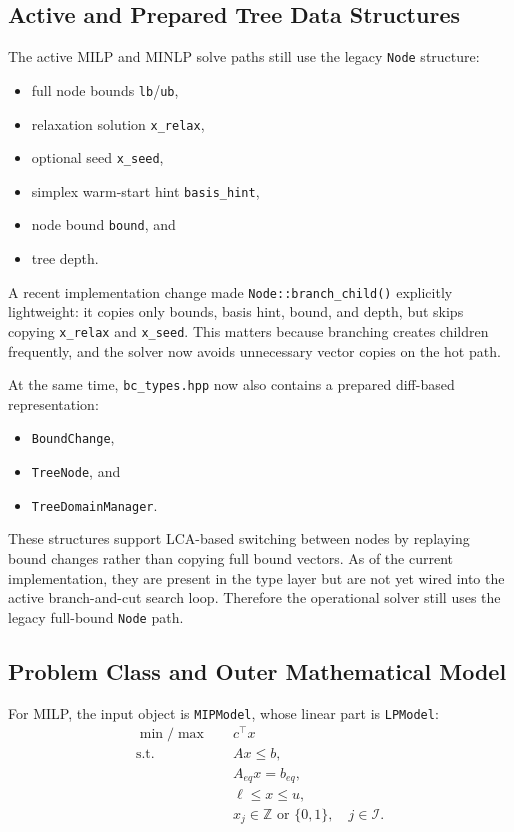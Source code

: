 \subsection{Active and Prepared Tree Data Structures}

The active MILP and MINLP solve paths still use the legacy \texttt{Node} structure:
\begin{itemize}
  \item full node bounds \texttt{lb}/\texttt{ub},
  \item relaxation solution \texttt{x\_relax},
  \item optional seed \texttt{x\_seed},
  \item simplex warm-start hint \texttt{basis\_hint},
  \item node bound \texttt{bound}, and
  \item tree depth.
\end{itemize}

A recent implementation change made \texttt{Node::branch\_child()} explicitly lightweight: it copies only bounds, basis hint, bound, and depth, but skips copying \texttt{x\_relax} and \texttt{x\_seed}. This matters because branching creates children frequently, and the solver now avoids unnecessary vector copies on the hot path.

At the same time, \texttt{bc\_types.hpp} now also contains a prepared diff-based representation:
\begin{itemize}
  \item \texttt{BoundChange},
  \item \texttt{TreeNode}, and
  \item \texttt{TreeDomainManager}.
\end{itemize}

These structures support LCA-based switching between nodes by replaying bound changes rather than copying full bound vectors. As of the current implementation, they are present in the type layer but are not yet wired into the active branch-and-cut search loop. Therefore the operational solver still uses the legacy full-bound \texttt{Node} path.

\subsection{Problem Class and Outer Mathematical Model}

For MILP, the input object is \texttt{MIPModel}, whose linear part is \texttt{LPModel}:
\begin{align}
  \min/\max \quad & c^\top x \\
  \text{s.t.}\quad & A x \le b, \\
                    & A_{eq} x = b_{eq}, \\
                    & \ell \le x \le u, \\
                    & x_j \in \mathbb{Z} \text{ or } \{0,1\}, \quad j \in \mathcal{I}.
\end{align}

